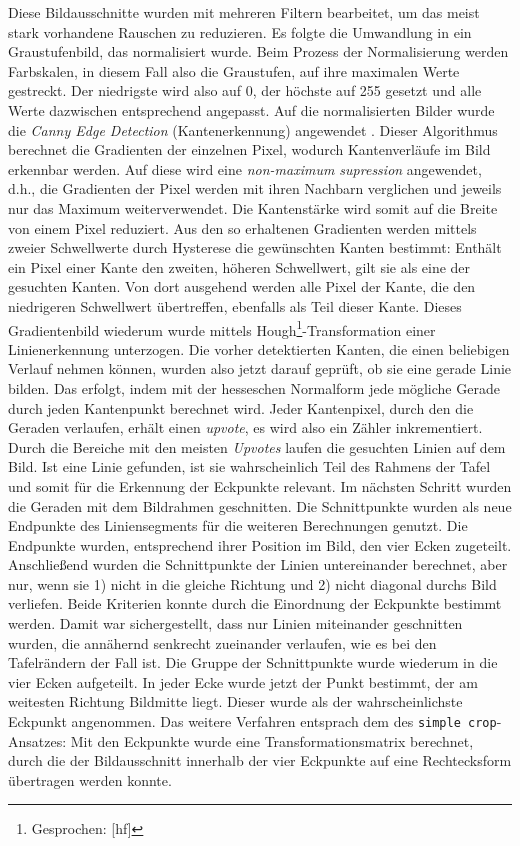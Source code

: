 Diese Bildausschnitte wurden mit mehreren Filtern bearbeitet, um das meist stark vorhandene Rauschen zu reduzieren. Es folgte die Umwandlung in ein Graustufenbild, das normalisiert wurde. Beim Prozess der Normalisierung werden Farbskalen, in diesem Fall also die Graustufen, auf ihre maximalen Werte gestreckt. Der niedrigste wird also auf 0, der höchste auf 255 gesetzt und alle Werte dazwischen entsprechend angepasst. Auf die normalisierten Bilder wurde die \textit{Canny Edge Detection} (Kantenerkennung) angewendet \cite{cannyedge}. Dieser Algorithmus berechnet die Gradienten der einzelnen Pixel, wodurch Kantenverläufe im Bild erkennbar werden. Auf diese wird eine \textit{non-maximum supression} angewendet, d.h., die Gradienten der Pixel werden mit ihren Nachbarn verglichen und jeweils nur das Maximum weiterverwendet. Die Kantenstärke wird somit auf die Breite von einem Pixel reduziert. Aus den so erhaltenen Gradienten werden mittels zweier Schwellwerte durch Hysterese die gewünschten Kanten bestimmt: Enthält ein Pixel einer Kante den zweiten, höheren Schwellwert, gilt sie als eine der gesuchten Kanten. Von dort ausgehend werden alle Pixel der Kante, die den niedrigeren Schwellwert übertreffen, ebenfalls als Teil dieser Kante.
Dieses Gradientenbild wiederum wurde mittels Hough\footnote{Gesprochen: [h\textturnv{}f]}-Transformation \cite{houghpatent} einer Linienerkennung unterzogen. Die vorher detektierten Kanten, die einen beliebigen Verlauf nehmen können, wurden also jetzt darauf geprüft, ob sie eine gerade Linie bilden. Das erfolgt, indem mit der hesseschen Normalform jede mögliche Gerade durch jeden Kantenpunkt berechnet wird. Jeder Kantenpixel, durch den die Geraden verlaufen, erhält einen \textit{upvote}, es wird also ein Zähler inkrementiert. Durch die Bereiche mit den meisten \textit{Upvotes} laufen die gesuchten Linien auf dem Bild. Ist eine Linie gefunden, ist sie wahrscheinlich Teil des Rahmens der Tafel und somit für die Erkennung der Eckpunkte relevant.
Im nächsten Schritt wurden die Geraden mit dem Bildrahmen geschnitten. Die Schnittpunkte wurden als neue Endpunkte des Liniensegments für die weiteren Berechnungen genutzt. Die Endpunkte wurden, entsprechend ihrer Position im Bild, den vier Ecken zugeteilt. Anschließend wurden die Schnittpunkte der Linien untereinander berechnet, aber nur, wenn sie 1) nicht in die gleiche Richtung und 2) nicht diagonal durchs Bild verliefen. Beide Kriterien konnte durch die Einordnung der Eckpunkte bestimmt werden. Damit war sichergestellt, dass nur Linien miteinander geschnitten wurden, die annähernd senkrecht zueinander verlaufen, wie es bei den Tafelrändern der Fall ist.
Die Gruppe der Schnittpunkte wurde wiederum in die vier Ecken aufgeteilt. In jeder Ecke wurde jetzt der Punkt bestimmt, der am weitesten Richtung Bildmitte liegt. Dieser wurde als der wahrscheinlichste Eckpunkt angenommen.
Das weitere Verfahren entsprach dem des \verb|simple crop|-Ansatzes: Mit den Eckpunkte wurde eine Transformationsmatrix berechnet, durch die der Bildausschnitt innerhalb der vier Eckpunkte auf eine Rechtecksform übertragen werden konnte.


